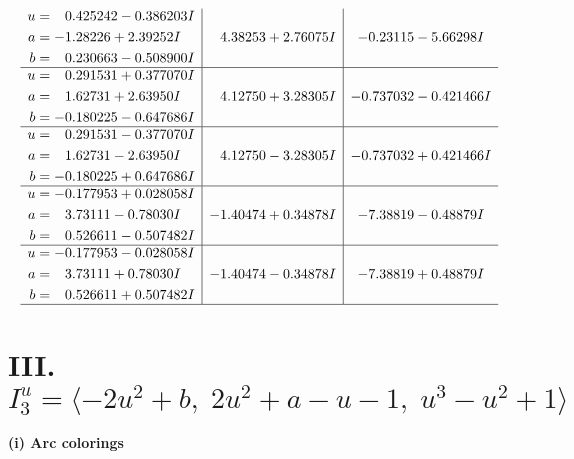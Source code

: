 \documentclass[1p]{elsarticle_modified}
\theoremstyle{definition}
\begin{document}
$$\begin{array}{c|c|c}
\begin{aligned}
u &= \phantom{-}0.425242 - 0.386203 I \\
a &= -1.28226 + 2.39252 I \\
b &= \phantom{-}0.230663 - 0.508900 I\end{aligned}
 & \phantom{-}4.38253 + 2.76075 I & -0.23115 - 5.66298 I \\ \hline\begin{aligned}
u &= \phantom{-}0.291531 + 0.377070 I \\
a &= \phantom{-}1.62731 + 2.63950 I \\
b &= -0.180225 - 0.647686 I\end{aligned}
 & \phantom{-}4.12750 + 3.28305 I & -0.737032 - 0.421466 I \\ \hline\begin{aligned}
u &= \phantom{-}0.291531 - 0.377070 I \\
a &= \phantom{-}1.62731 - 2.63950 I \\
b &= -0.180225 + 0.647686 I\end{aligned}
 & \phantom{-}4.12750 - 3.28305 I & -0.737032 + 0.421466 I \\ \hline\begin{aligned}
u &= -0.177953 + 0.028058 I \\
a &= \phantom{-}3.73111 - 0.78030 I \\
b &= \phantom{-}0.526611 - 0.507482 I\end{aligned}
 & -1.40474 + 0.34878 I & -7.38819 - 0.48879 I \\ \hline\begin{aligned}
u &= -0.177953 - 0.028058 I \\
a &= \phantom{-}3.73111 + 0.78030 I \\
b &= \phantom{-}0.526611 + 0.507482 I\end{aligned}
 & -1.40474 - 0.34878 I & -7.38819 + 0.48879 I\\
 \hline 
 \end{array}$$\newpage\newpage\renewcommand{\arraystretch}{1}
\centering \section*{III. $I^u_{3}= \langle -2 u^2+b,\;2 u^2+a- u-1,\;u^3- u^2+1 \rangle$}
\flushleft \textbf{(i) Arc colorings}\\
\end{document}
